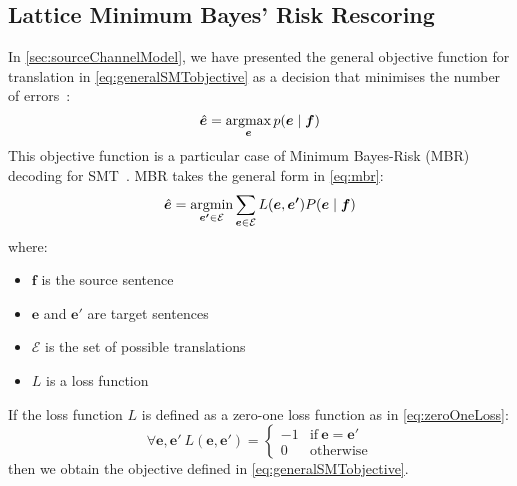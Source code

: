 \subsection{Lattice Minimum Bayes' Risk Rescoring} \label{sec:lmbr}


In \autoref{sec:sourceChannelModel}, we have presented the general
objective function for translation in \autoref{eq:generalSMTobjective}
as a decision that
minimises the number of
errors~\citep[p.~39-40]{bishop:2006:book}:
%
\begin{equation}
  \hat{\bm{e}} = \operatorname*{argmax}_{\bm{e}} p(\bm{e} \mid \bm{f})
  \label{eq:generalSMTobjective}
\end{equation}
%
This objective function is a particular case of
Minimum Bayes-Risk (MBR) decoding for SMT~\citep{kumar-byrne:2004:NAACL}.
MBR takes the general form in \autoref{eq:mbr}:
%
\begin{equation} \label{eq:mbr}
  \hat{\bm{e}} = \operatorname*{argmin}_{\bm{e'} \in \mathcal{E}} \sum_{\bm{e} \in \mathcal{E}} L(\bm{e},\bm{e'}) P(\bm{e} \mid \bm{f})
\end{equation}
%
where:
%
\begin{itemize}
  \item $\bm{f}$ is the source sentence
  \item $\bm{e}$ and $\bm{e'}$ are target sentences
  \item $\mathcal{E}$ is the set of possible translations
  \item $L$ is a loss function
\end{itemize}
%
If the loss function $L$ is defined as a zero-one loss function as
in \autoref{eq:zeroOneLoss}:
%
\begin{equation}
\forall \bm{e}, \bm{e'} \ L(\bm{e}, \bm{e'}) =
\begin{cases}
  -1 & \text{if}\ \bm{e} = \bm{e'} \\
  0  & \text{otherwise}
\end{cases}
\label{eq:zeroOneLoss}
\end{equation}
%
then we obtain the objective defined in \autoref{eq:generalSMTobjective}.
